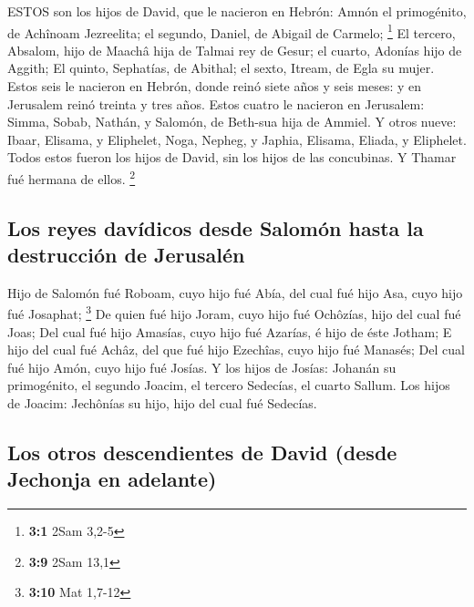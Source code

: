  ESTOS son los hijos de David, que le nacieron en Hebrón:
Amnón el primogénito, de Achînoam Jezreelita; el segundo, Daniel, de
Abigail de Carmelo; \footnote{\textbf{3:1} 2Sam 3,2-5}  El
tercero, Absalom, hijo de Maachâ hija de Talmai rey de Gesur; el cuarto,
Adonías hijo de Aggith;  El quinto, Sephatías, de Abithal;
el sexto, Itream, de Egla su mujer.  Estos seis le nacieron
en Hebrón, donde reinó siete años y seis meses: y en Jerusalem reinó
treinta y tres años.  Estos cuatro le nacieron en Jerusalem:
Simma, Sobab, Nathán, y Salomón, de Beth-sua hija de Ammiel.
 Y otros nueve: Ibaar, Elisama, y Eliphelet, 
Noga, Nepheg, y Japhia,  Elisama, Eliada, y Eliphelet.
 Todos estos fueron los hijos de David, sin los hijos de las
concubinas. Y Thamar fué hermana de ellos. \footnote{\textbf{3:9} 2Sam
  13,1}

\hypertarget{los-reyes-davuxeddicos-desde-salomuxf3n-hasta-la-destrucciuxf3n-de-jerusaluxe9n}{%
\subsection{Los reyes davídicos desde Salomón hasta la destrucción de
Jerusalén}\label{los-reyes-davuxeddicos-desde-salomuxf3n-hasta-la-destrucciuxf3n-de-jerusaluxe9n}}

 Hijo de Salomón fué Roboam, cuyo hijo fué Abía, del cual
fué hijo Asa, cuyo hijo fué Josaphat; \footnote{\textbf{3:10} Mat 1,7-12}
 De quien fué hijo Joram, cuyo hijo fué Ochôzías, hijo del
cual fué Joas;  Del cual fué hijo Amasías, cuyo hijo fué
Azarías, é hijo de éste Jotham;  E hijo del cual fué Achâz,
del que fué hijo Ezechîas, cuyo hijo fué Manasés;  Del cual
fué hijo Amón, cuyo hijo fué Josías.  Y los hijos de
Josías: Johanán su primogénito, el segundo Joacim, el tercero Sedecías,
el cuarto Sallum.  Los hijos de Joacim: Jechônías su hijo,
hijo del cual fué Sedecías.

\hypertarget{los-otros-descendientes-de-david-desde-jechonja-en-adelante}{%
\subsection{Los otros descendientes de David (desde Jechonja en
adelante)}\label{los-otros-descendientes-de-david-desde-jechonja-en-adelante}}

